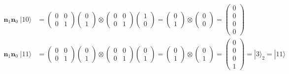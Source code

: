 \documentclass{article}
\begin{document}
\begin{align*}
\bm{n}_1\bm{n}_0 \; |10\rangle
  &= \begin{pmatrix}0 & 0\\0 & 1\end{pmatrix}
     \begin{pmatrix}0\\1\end{pmatrix}
     \otimes
     \begin{pmatrix}0 & 0\\0 & 1\end{pmatrix}
     \begin{pmatrix}1\\0\end{pmatrix}
     = \begin{pmatrix}0\\1\end{pmatrix}
     \otimes
     \begin{pmatrix}0\\0\end{pmatrix}
     = \begin{pmatrix}0\\0\\0\\0\end{pmatrix}\\
\bm{n}_1\bm{n}_0 \; |11\rangle
  &= \begin{pmatrix}0 & 0\\0 & 1\end{pmatrix}
     \begin{pmatrix}0\\1\end{pmatrix}
     \otimes
     \begin{pmatrix}0 & 0\\0 & 1\end{pmatrix}
     \begin{pmatrix}0\\1\end{pmatrix}
     = \begin{pmatrix}0\\1\end{pmatrix}
     \otimes
     \begin{pmatrix}0\\1\end{pmatrix}
     = \begin{pmatrix}0\\0\\0\\1\end{pmatrix}
     = |3\rangle_{2} = |11\rangle\\
\end{align*}



\printbibliography
\end{document}
